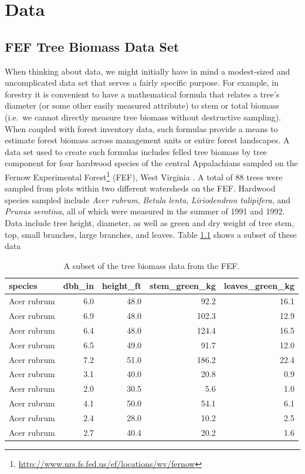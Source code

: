\documentclass[]{krantz}
\renewcommand{\href}[2]{#2\footnote{\url{#1}}}
\theoremstyle{definition}
\theoremstyle{definition}
\theoremstyle{definition}
\theoremstyle{remark}
\begin{document}
\chapter{Data}\label{data}

\section{FEF Tree Biomass Data Set}\label{fef}

When thinking about data, we might initially have in mind a modest-sized
and uncomplicated data set that serves a fairly specific purpose. For
example, in forestry it is convenient to have a mathematical formula
that relates a tree's diameter (or some other easily measured attribute)
to stem or total biomass (i.e.~we cannot directly measure tree biomass
without destructive sampling). When coupled with forest inventory data,
such formulas provide a means to estimate forest biomass across
management units or entire forest landscapes. A data set used to create
such formulas includes felled tree biomass by tree component for four
hardwood species of the central Appalachians sampled on the
\href{http://www.nrs.fs.fed.us/ef/locations/wv/fernow}{Fernow
Experimental Forest} (FEF), West Virginia \citet{Wood2016}. A total of
88 trees were sampled from plots within two different watersheds on the
FEF. Hardwood species sampled include \emph{Acer rubrum}, \emph{Betula
lenta}, \emph{Liriodendron tulipifera}, and \emph{Prunus serotina}, all
of which were measured in the summer of 1991 and 1992. Data include tree
height, diameter, as well as green and dry weight of tree stem, top,
small branches, large branches, and leaves. Table \ref{tab:sppbio} shows
a subset of these data

\begin{table}

\caption{\label{tab:sppbio}A subset of the tree biomass data from the FEF.}
\centering
\begin{tabular}[t]{lrrrr}
\toprule
species & dbh\_in & height\_ft & stem\_green\_kg & leaves\_green\_kg\\
\midrule
Acer rubrum & 6.0 & 48.0 & 92.2 & 16.1\\
Acer rubrum & 6.9 & 48.0 & 102.3 & 12.9\\
Acer rubrum & 6.4 & 48.0 & 124.4 & 16.5\\
Acer rubrum & 6.5 & 49.0 & 91.7 & 12.0\\
Acer rubrum & 7.2 & 51.0 & 186.2 & 22.4\\
\addlinespace
Acer rubrum & 3.1 & 40.0 & 20.8 & 0.9\\
Acer rubrum & 2.0 & 30.5 & 5.6 & 1.0\\
Acer rubrum & 4.1 & 50.0 & 54.1 & 6.1\\
Acer rubrum & 2.4 & 28.0 & 10.2 & 2.5\\
Acer rubrum & 2.7 & 40.4 & 20.2 & 1.6\\
\bottomrule
\end{tabular}
\end{table}
\end{document}
